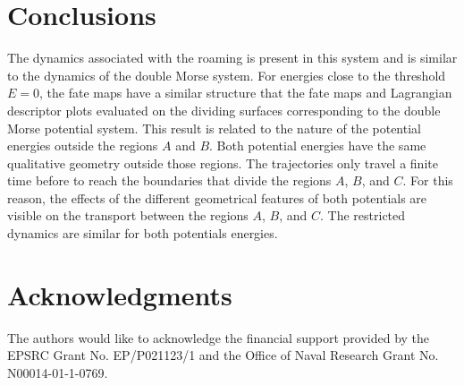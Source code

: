\documentclass[10pt,aps,onecolumn,superscriptaddress]{revtex4-2}
\begin{document}
\section{Conclusions}
\label{sec:conclusion}



The dynamics associated with the roaming is present in this system and is similar to the dynamics of the double Morse system. For energies close to the threshold $E=0$, the fate maps have a similar structure that the fate maps and Lagrangian descriptor plots evaluated on the dividing surfaces corresponding to the double Morse potential system. This result is related to the nature of the potential energies outside the regions $A$ and $B$. Both potential energies have the same qualitative geometry outside those regions. The trajectories only travel a finite time before to reach the boundaries that divide the regions $A$, $B$, and $C$.
For this reason, the effects of the different geometrical features of both potentials are visible on the transport between the regions $A$, $B$, and $C$. The restricted dynamics are similar for both potentials energies.  
  


\section*{Acknowledgments}
The authors would like to acknowledge the financial support provided by the EPSRC Grant No. EP/P021123/1 and the Office of Naval Research Grant No. N00014-01-1-0769.


\end{document}
